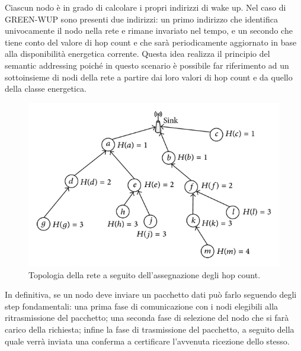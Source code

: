 \documentclass{report}
\begin{document}
Ciascun nodo è in grado di calcolare i propri indirizzi di wake up. Nel caso di GREEN-WUP sono presenti due indirizzi: un primo indirizzo che identifica
univocamente il nodo nella rete e rimane invariato nel tempo, e un secondo che tiene conto del valore di hop count e che sarà periodicamente aggiornato
in base alla disponibilità energetica corrente. Questa idea realizza il principio del semantic addressing poiché in questo scenario
è possibile far riferimento ad un sottoinsieme di nodi della rete a partire dai loro valori di hop count e da quello della classe energetica. \\

\begin{figure}
    \begin{center}
        \includegraphics[scale=1.7]{hop-count-algorithm.png}
        \caption{Topologia della rete a seguito dell'assegnazione degli hop count.}
    \end{center}
\end{figure}

In definitiva, se un nodo deve inviare un pacchetto dati può farlo seguendo degli step fondamentali: una prima fase di comunicazione con i nodi elegibili
alla ritrasmissione del pacchetto; una seconda fase di selezione del nodo che si farà carico della richiesta; infine la fase di trasmissione del pacchetto,
a seguito della quale verrà inviata una conferma a certificare l'avvenuta ricezione dello stesso.\\
\end{document}
